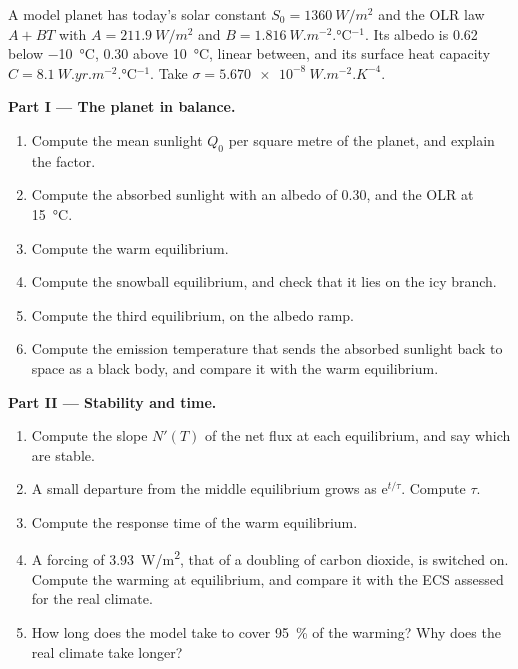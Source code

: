 \begin{problem}
\label{pb:b3:climate-models:1}
A model planet has today's solar constant $S_0 = \qty{1360}{W/m^2}$ and the
OLR law $A + BT$ with $A = \qty{211.9}{W/m^2}$ and $B =
\qty{1.816}{W.m^{-2}.\celsius^{-1}}$. Its albedo is 0.62 below
\qty{-10}{\celsius}, 0.30 above \qty{+10}{\celsius}, linear between, and
its surface heat capacity $C = \qty{8.1}{W.yr.m^{-2}.\celsius^{-1}}$. Take
$\sigma = \qty{5.670e-8}{W.m^{-2}.K^{-4}}$.

\medskip\noindent\textbf{Part I --- The planet in balance.}
\begin{enumerate}
\item Compute the mean sunlight $Q_0$ per square metre of the planet, and
  explain the factor.
\item Compute the absorbed sunlight with an albedo of 0.30, and the OLR at
  \qty{15}{\celsius}.
\item Compute the warm equilibrium.
\item Compute the snowball equilibrium, and check that it lies on the
  icy branch.
\item Compute the third equilibrium, on the albedo ramp.
\item Compute the emission temperature that sends the absorbed sunlight
  back to space as a black body, and compare it with the warm equilibrium.
\end{enumerate}

\medskip\noindent\textbf{Part II --- Stability and time.}
\begin{enumerate}[resume]
\item Compute the slope $N'(T)$ of the net flux at each equilibrium, and say
  which are stable.
\item A small departure from the middle equilibrium grows as $\mathrm
  e^{t/\tau}$. Compute $\tau$.
\item Compute the response time of the warm equilibrium.
\item A forcing of \qty{3.93}{W/m^2}, that of a doubling of carbon dioxide,
  is switched on. Compute the warming at equilibrium, and compare it with
  the ECS assessed for the real climate.
\item How long does the model take to cover \qty{95}{\percent} of the
  warming? Why does the real climate take longer?
\end{enumerate}


\end{problem}
